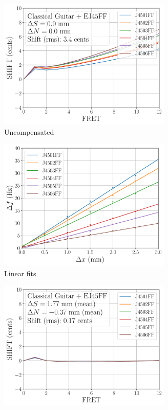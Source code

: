  \begin{figure}
   \centering
   \begin{subfigure}[b]{0.46\textwidth}
    \centering
    \includegraphics[width=3.25in]{../figures/shift_classicalguitar_ej45ff_null}
    \caption{Uncompensated}
    \label{fig:shift_classicalguitar_ej45ff_null}
   \end{subfigure}
   \hspace{0.25in}
   \begin{subfigure}[b]{0.46\textwidth}
    \centering
    \includegraphics[width=3.25in]{../figures/fit_ej45ff}
    \caption{Linear fits}
    \label{fig:fit_ej45ff}
   \end{subfigure}
   \par\vspace{0.25in}
   \begin{subfigure}[b]{0.46\textwidth}
    \centering
    \includegraphics[width=3.25in]{../figures/shift_classicalguitar_ej45ff_full}

\end{subfigure}
\end{figure}
